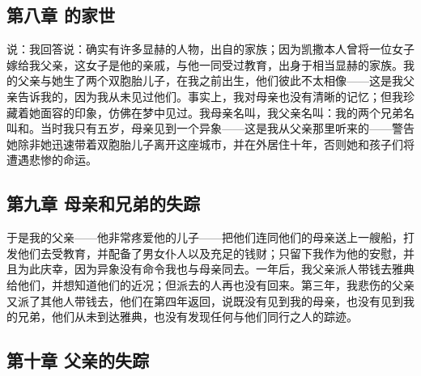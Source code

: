\subsection{第八章  的家世}

说：我回答说：确实有许多显赫的人物，出自的家族；因为凯撒本人曾将一位女子嫁给我父亲，这女子是他的亲戚，与他一同受过教育，出身于相当显赫的家族。我的父亲与她生了两个双胞胎儿子，在我之前出生，他们彼此不太相像——这是我父亲告诉我的，因为我从未见过他们。事实上，我对母亲也没有清晰的记忆；但我珍藏着她面容的印象，仿佛在梦中见过。我母亲名叫，我父亲名叫：我的两个兄弟名叫和。当时我只有五岁，母亲见到一个异象——这是我从父亲那里听来的——警告她除非她迅速带着双胞胎儿子离开这座城市，并在外居住十年，否则她和孩子们将遭遇悲惨的命运。\par


\subsection{第九章  母亲和兄弟的失踪}

于是我的父亲——他非常疼爱他的儿子——把他们连同他们的母亲送上一艘船，打发他们去受教育，并配备了男女仆人以及充足的钱财；只留下我作为他的安慰，并且为此庆幸，因为异象没有命令我也与母亲同去。一年后，我父亲派人带钱去雅典给他们，并想知道他们的近况；但派去的人再也没有回来。第三年，我悲伤的父亲又派了其他人带钱去，他们在第四年返回，说既没有见到我的母亲，也没有见到我的兄弟，他们从未到达雅典，也没有发现任何与他们同行之人的踪迹。\par


\subsection{第十章  父亲的失踪}

\par


